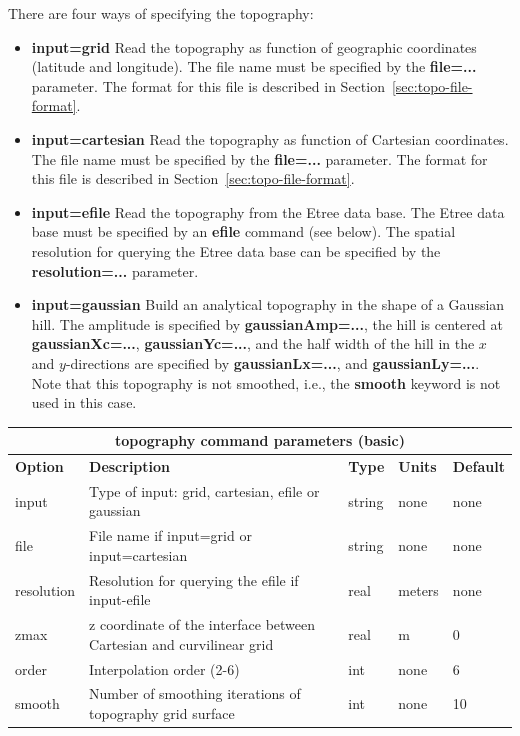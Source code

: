 \documentclass[11pt]{report}
\begin{document}
There are four ways of specifying the topography:
\begin{itemize}
\item {\bf input=grid} Read the topography as function of geographic coordinates (latitude and
  longitude). The file name must be specified by the {\bf file=...} parameter. The format for this
  file is described in Section~\ref{sec:topo-file-format}.
\item {\bf input=cartesian} Read the topography as function of Cartesian coordinates. The file name
   must be specified by the {\bf file=...} parameter. The format for this file is described in
   Section~\ref{sec:topo-file-format}.
\item {\bf input=efile} Read the topography from the Etree data base. The Etree data base must be
  specified by an {\bf efile} command (see below). The spatial resolution for querying the Etree
  data base can be specified by the {\bf resolution=...} parameter.
\item {\bf input=gaussian} Build an analytical topography in the shape of a Gaussian hill. The
  amplitude is specified by {\bf gaussianAmp=...}, the hill is centered at {\bf gaussianXc=...},
  {\bf gaussianYc=...}, and the half width of the hill in the $x$ and $y$-directions are specified by 
   {\bf gaussianLx=...}, and {\bf gaussianLy=...}. Note that this topography is not smoothed, i.e.,
   the {\bf smooth} keyword is not used in this case.
\end{itemize}
%
\begin{center}
\begin{tabular}{|l|p{8cm}|l|l|l|} \hline
\multicolumn{5}{|c|}{\bf topography command parameters (basic)}\\ \hline
\bf{Option} & \bf{Description} & \bf{Type} & \bf{Units} & \bf{Default}\\ \hline \hline
%
input & Type of input: grid, cartesian, efile or gaussian & string & none & none\\ \hline
%
file & File name if input=grid or input=cartesian & string & none & none\\ \hline
%
resolution & Resolution for querying the efile if input-efile & real & meters & none \\ \hline
%
zmax & z coordinate of the interface between  Cartesian and curvilinear grid& real &  m & 0\\ \hline
%
order & Interpolation order (2-6) & int & none & 6\\ \hline
%
smooth & Number of smoothing iterations of topography grid surface & int & none & 10 \\ \hline
\end{tabular}
\end{center}
\end{document}
